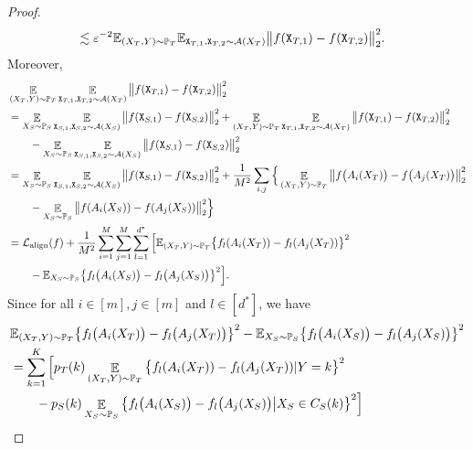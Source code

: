 \begin{proof}
\begin{align}
&\lesssim \varepsilon^{-2}\mathbb{E}_{(X_T, Y) \sim \mathbb{P}_T}\mathbb{E}_{\mathtt{X}_{T,1}, \mathtt{X}_{T,2} \sim \mathcal{A}(X_T)}\big\Vert f(\mathtt{X}_{T,1}) - f(\mathtt{X}_{T,2})\big\Vert^2_2.
\end{align}
Moreover,
\begin{align}
\label{eq: downstream alignment = upstream alignment + radius}
&\mathop{\mathbb{E}}_{(X_T, Y) \sim \mathbb{P}_T}\mathop{\mathbb{E}}_{\mathtt{X}_{T,1},\mathtt{X}_{T,2} \sim \mathcal{A}(X_T)}\big\Vert f(\mathtt{X}_{T,1}) - f(\mathtt{X}_{T,2})\big\Vert_2^2 \nonumber\\
&=  \mathop{\mathbb{E}}_{X_S \sim \mathbb{P}_S}\mathop{\mathbb{E}}_{\mathtt{X}_{S,1},\mathtt{X}_{S,2} \sim \mathcal{A}(X_S)}\big\Vert f(\mathtt{X}_{S,1}) - f(\mathtt{X}_{S,2})\big\Vert_2^2 + \mathop{\mathbb{E}}_{(X_T, Y) \sim \mathbb{P}_T}\mathop{\mathbb{E}}_{\mathtt{X}_{T,1},\mathtt{X}_{T,2} \sim \mathcal{A}(X_T)}\big\Vert f(\mathtt{X}_{T,1}) - f(\mathtt{X}_{T,2})\big\Vert_2^2 \nonumber \\
&\qquad - \mathop{\mathbb{E}}_{X_S \sim \mathbb{P}_S}\mathop{\mathbb{E}}_{\mathtt{X}_{S,1},\mathtt{X}_{S,2} \sim \mathcal{A}(X_S)}\big\Vert f(\mathtt{X}_{S,1}) - f(\mathtt{X}_{S,2})\big\Vert_2^2 \nonumber \\ 
&= \mathop{\mathbb{E}}_{X_S \sim \mathbb{P}_S}\mathop{\mathbb{E}}_{\mathtt{X}_{S,1},\mathtt{X}_{S,2} \sim \mathcal{A}(X_S)}\big\Vert f(\mathtt{X}_{S,1}) - f(\mathtt{X}_{S,2})\big\Vert_2^2 + \frac{1}{M^2}\sum_{i,j}\Big\{\mathop{\mathbb{E}}_{(X_T, Y) \sim \mathbb{P}_T}\big\Vert f\big(A_i(X_T)\big) - f\big(A_j(X_T)\big)\big\Vert_2^2  \nonumber\\
&\qquad - \mathop{\mathbb{E}}_{X_S \sim \mathbb{P}_S}\big\Vert f(A_i(X_S)) - f(A_j(X_S))\big\Vert_2^2\Big\} \nonumber \\
&=  \mathcal{L}_{\mathrm{align}}(f) + \frac{1}{M^2}\sum_{i=1}^M\sum_{j=1}^M\sum_{l=1}^{d^*}\Big[\mathbb{E}_{(X_T, Y) \sim \mathbb{P}_T}\big\{f_l(A_i(X_T)) - f_l(A_j(X_T))\big\}^2 \nonumber \\
&\qquad - \mathbb{E}_{X_S \sim \mathbb{P}_S}\big\{f_l\big(A_i(X_S)\big) - f_l\big(A_j(X_S)\big)\big\}^2\Big].
\end{align}
Since for all $i \in [m], j \in [m]$ and $l \in [d^*]$, we have
\begin{align}
\label{eq: radius ≤ ɛ}
&\E_{(X_T, Y) \sim \P_T}\big\{f_l\big(A_i(X_T)\big) - f_l\big(A_j(X_T)\big)\big\}^2 - \E_{X_S \sim \P_S}\big\{f_l\big(A_i(X_S)\big) - f_l\big(A_j(X_S)\big)\big\}^2 \nonumber \\
&= \sum_{k=1}^{K}\Big[p_T(k)\mathop{\E}_{(X_T, Y) \sim \P_T}\big\{f_l(A_i(X_T)) - f_l(A_j(X_T))\vert Y = k\big\}^2 \nonumber \\
&\qquad -  p_S(k)\mathop{\E}_{X_S\sim \P_S}\big\{f_l\big(A_i(X_S)\big) - f_l\big(A_j(X_S)\big)\big\vert X_S \in C_S(k)\big\}^2\Big] \nonumber \\

\end{align}
\end{proof}
